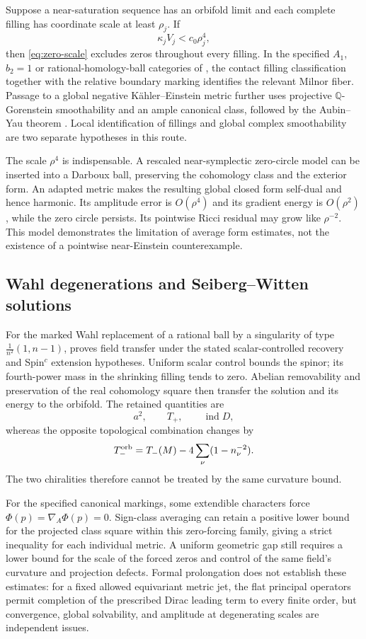 \documentclass[11pt,a4paper]{article}
\theoremstyle{definition}\newtheorem{definition}[theorem]{Definition}
\theoremstyle{remark}\newtheorem{remark}[theorem]{Remark}
\DeclareMathOperator{\ind}{ind}
\begin{document}
Suppose a near-saturation sequence has an orbifold limit and each complete filling has coordinate scale at least $\rho_j$. If
\[
 \kappa_jV_j<c_0\rho_j^4,
\]
then \eqref{eq:zero-scale} excludes zeros throughout every filling. In the specified $A_1$, $b_2=1$ or rational-homology-ball categories of \cite{source-zeros}, the contact filling classification together with the relative boundary marking identifies the relevant Milnor fiber. Passage to a global negative K\"ahler--Einstein metric further uses projective $\mathbb Q$-Gorenstein smoothability and an ample canonical class, followed by the Aubin--Yau theorem \cite{Aubin,Yau}. Local identification of fillings and global complex smoothability are two separate hypotheses in this route.

The scale $\rho^4$ is indispensable. A rescaled near-symplectic zero-circle model can be inserted into a Darboux ball, preserving the cohomology class and the exterior form. An adapted metric makes the resulting global closed form self-dual and hence harmonic. Its amplitude error is $O(\rho^4)$ and its gradient energy is $O(\rho^2)$, while the zero circle persists. Its pointwise Ricci residual may grow like $\rho^{-2}$. This model demonstrates the limitation of average form estimates, not the existence of a pointwise near-Einstein counterexample.

\subsection{Wahl degenerations and Seiberg--Witten solutions}
For the marked Wahl replacement of a rational ball by a singularity of type $\frac1{n^2}(1,n-1)$, \cite{source-wahl} proves field transfer under the stated scalar-controlled recovery and Spin$^c$ extension hypotheses. Uniform scalar control bounds the spinor; its fourth-power mass in the shrinking filling tends to zero. Abelian removability and preservation of the real cohomology square then transfer the solution and its energy to the orbifold. The retained quantities are
\[
 a^2,\qquad T_+,\qquad\ind D,
\]
whereas the opposite topological combination changes by
\begin{equation}\label{eq:Wahl}
 T_-^{\rm orb}=T_-(M)-4\sum_\nu(1-n_\nu^{-2}).
\end{equation}
The two chiralities therefore cannot be treated by the same curvature bound.

For the specified canonical markings, some extendible characters force $\Phi(p)=\nabla_A\Phi(p)=0$. Sign-class averaging can retain a positive lower bound for the projected class square within this zero-forcing family, giving a strict inequality for each individual metric. A uniform geometric gap still requires a lower bound for the scale of the forced zeros and control of the same field's curvature and projection defects. Formal prolongation does not establish these estimates: for a fixed allowed equivariant metric jet, the flat principal operators permit completion of the prescribed Dirac leading term to every finite order, but convergence, global solvability, and amplitude at degenerating scales are independent issues.
\end{document}
